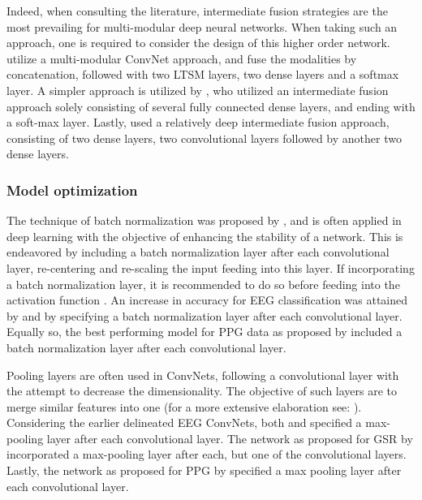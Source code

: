 \documentclass[12pt]{article}
\begin{document}
Indeed, when consulting the literature, intermediate fusion strategies are the most prevailing for multi-modular deep neural networks. When taking such an approach, one is required to consider the design of this higher order network.  utilize a multi-modular ConvNet approach, and fuse the modalities by concatenation, followed with two LTSM layers, two dense layers and a softmax layer. A simpler approach is utilized by	, who utilized an intermediate fusion approach solely consisting of several fully connected dense layers, and ending with a soft-max layer. Lastly,  used a relatively deep intermediate fusion approach, consisting of two dense layers, two convolutional layers followed by another two dense layers.  

\subsubsection{Model optimization}
The technique of batch normalization was proposed by  ,  and is often applied in deep learning with the objective of enhancing the stability of a network. This is endeavored by including a batch normalization layer after each convolutional layer, re-centering and re-scaling the input feeding into this layer. If incorporating a batch normalization layer, it is recommended to do so before feeding into the activation function \cite{ioffe2015batch}. An increase in accuracy for EEG classification was attained by  and  by specifying a batch normalization layer after each convolutional layer. Equally so, the best performing model for PPG data as proposed by  included a batch normalization layer after each convolutional layer.  

Pooling layers are often used in ConvNets, following a convolutional layer with the attempt to decrease the dimensionality. The objective of such layers are to merge similar features into one (for a more extensive elaboration see: ). Considering the earlier delineated EEG ConvNets, both  and  specified a max-pooling layer after each convolutional layer. The network as proposed for GSR by  incorporated a max-pooling layer after each, but one of the convolutional layers. Lastly, the network as proposed for PPG by \cite{biswas2019cornet}  specified a max pooling layer after each convolutional layer. 
\end{document}
